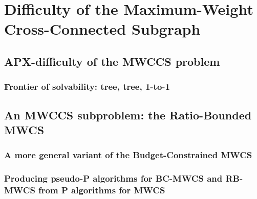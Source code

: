 \chapter{Difficulty of the Maximum-Weight Cross-Connected Subgraph}

\section{APX-difficulty of the MWCCS problem}
	\subsection{Frontier of solvability: tree, tree, 1-to-1}

\section{An MWCCS subproblem: the Ratio-Bounded MWCS}
	\subsection{A more general variant of the Budget-Constrained MWCS}
	\subsection{Producing pseudo-P algorithms for BC-MWCS and RB-MWCS from P algorithms for MWCS}
